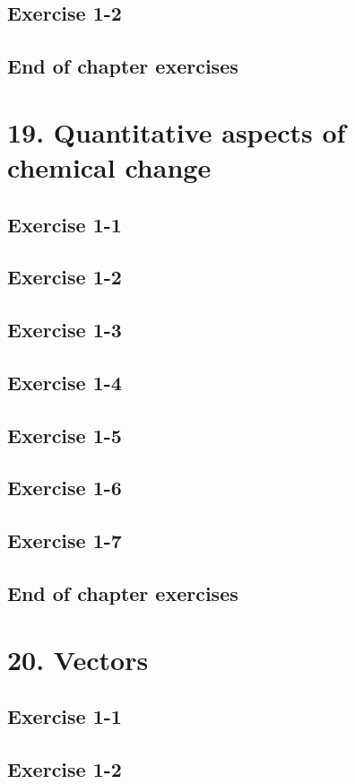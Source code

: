 \begin{enumerate}[label=\textbf{\arabic*}., itemsep=5pt]
\subsection{Exercise 1-2}
\subsection{End of chapter exercises}
\section{19. Quantitative aspects of chemical change}
\subsection{Exercise 1-1}
\subsection{Exercise 1-2}
\subsection{Exercise 1-3}
\subsection{Exercise 1-4}
\subsection{Exercise 1-5}
\subsection{Exercise 1-6}
\subsection{Exercise 1-7}
\subsection{End of chapter exercises}
\section{20. Vectors}
\subsection{Exercise 1-1}
\subsection{Exercise 1-2}

\end{enumerate}
